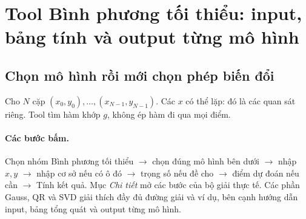 \chapter[Bình phương tối thiểu: từng mô hình]{Tool Bình phương tối thiểu: input, bảng tính và output từng mô hình}
\label{ch:ls}
\examplebreak
\section{Chọn mô hình rồi mới chọn phép biến đổi}
Cho $N$ cặp $(x_0,y_0),\ldots,(x_{N-1},y_{N-1})$. Các $x$ có thể lặp: đó là các quan sát riêng. Tool tìm hàm khớp $g$, không ép hàm đi qua mọi điểm.

\subsubsection*{Các bước bấm.} Chọn nhóm Bình phương tối thiểu $\to$ chọn đúng mô hình bên dưới $\to$ nhập $x,y$ $\to$ nhập cơ sở nếu có ô đó $\to$ trọng số nếu đề cho $\to$ điểm dự đoán nếu cần $\to$ Tính kết quả. Mục \emph{Chi tiết} mở các bước của bộ giải thực tế. Các phần Gauss, QR và SVD giải thích đầy đủ đường giải và ví dụ, bên cạnh hướng dẫn input, bảng tổng quát và output từng mô hình.

\examplebreak
